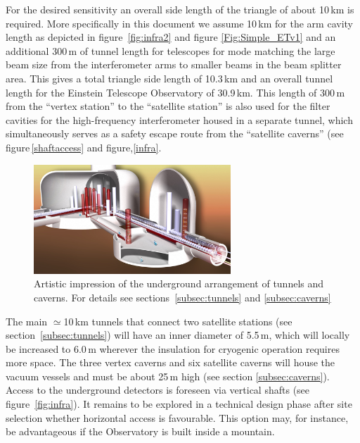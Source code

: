 For the desired sensitivity an overall side length of the triangle of about 10\,km is 
required. More specifically in this document we assume 10\,km for the arm cavity 
length as depicted in figure~\ref{fig:infra2} and figure \ref{Fig:Simple_ETv1} and an
additional 300\,m of tunnel length for telescopes for mode matching the large 
beam size from the interferometer arms to smaller beams in the beam splitter area. 
This gives a total triangle side length of 10.3\,km and an overall tunnel length for 
the Einstein Telescope Observatory of 30.9\,km. This length of 300\,m from the ``vertex 
station'' to the ``satellite station'' is also used for the filter cavities for the high-frequency 
interferometer housed in a separate tunnel, which simultaneously serves as a safety 
escape route from the ``satellite caverns'' (see figure\,\ref{shaftaccess} and figure,\ref{infra}.  

\begin{figure}
	\centering
\vskip 0.1cm
		\includegraphics[width=0.66\textwidth]{Sec_SiteInfra/Figures/ArtisticView1.jpg}
	\caption{Artistic impression of the underground arrangement of tunnels and 
	caverns. For details see sections~\ref{subsec:tunnels} and \ref{subsec:caverns}}
	\label{fig:Artisticview1}
\end{figure}
The main $\simeq$10\,km tunnels that \mbox{connect} two satellite stations (see 
section~\ref{subsec:tunnels}) will have an inner diameter of 5.5\,m, which will \mbox{locally} 
be increased to 6.0\,m wherever the insulation for \mbox{cryogenic} operation requires more 
space. The three {\mbox vertex} caverns and six satellite caverns will house the 
vacuum \mbox{vessels} and must be about 25\,m high (see section \ref{subsec:caverns}). 
Access to the \mbox{underground} detectors is foreseen via vertical shafts (see 
figure~\ref{fig:infra}). It remains to be explored in a technical design phase after site 
selection whether horizontal access is favourable. This option may, for instance, be 
advantageous if the \mbox{Observatory} is built inside a mountain. 

